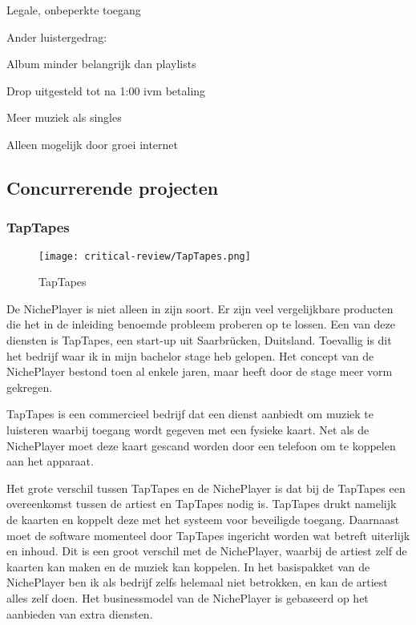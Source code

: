 \begin{todolist}
    \item Legale, onbeperkte toegang
    \item Ander luistergedrag: \begin{todolist}
        \item Album minder belangrijk dan playlists
        \item Drop uitgesteld tot na 1:00 ivm betaling
    \end{todolist}
    \item Meer muziek als singles
    \item Alleen mogelijk door groei internet
\end{todolist}

\subsection{Concurrerende projecten}
\subsubsection*{TapTapes}
\begin{wrapfigure}{r}{0.25\textwidth}
    \centering
    \texttt{[image: critical-review/TapTapes.png]}
    \caption{TapTapes}
    \label{fig:critical-review:TapTapes}
\end{wrapfigure}
De NichePlayer is niet alleen in zijn soort. Er zijn veel vergelijkbare producten die het in de inleiding benoemde probleem proberen op te lossen. Een van deze diensten is TapTapes, een start-up uit Saarbrücken, Duitsland. Toevallig is dit het bedrijf waar ik in mijn bachelor stage heb gelopen. Het concept van de NichePlayer bestond toen al enkele jaren, maar heeft door de stage meer vorm gekregen.

TapTapes is een commercieel bedrijf dat een dienst aanbiedt om muziek te luisteren waarbij toegang wordt gegeven met een fysieke kaart. Net als de NichePlayer moet deze kaart gescand worden door een telefoon om te koppelen aan het apparaat.

Het grote verschil tussen TapTapes en de NichePlayer is dat bij de TapTapes een overeenkomst tussen de artiest en TapTapes nodig is. TapTapes drukt namelijk de kaarten  en koppelt deze met het systeem voor beveiligde toegang. Daarnaast moet de software momenteel door TapTapes ingericht worden wat betreft uiterlijk en inhoud. Dit is een groot verschil met de NichePlayer, waarbij de artiest zelf de kaarten kan maken en de muziek kan koppelen. In het basispakket van de NichePlayer ben ik als bedrijf zelfs helemaal niet betrokken, en kan de artiest alles zelf doen. Het businessmodel van de NichePlayer is gebaseerd op het aanbieden van extra diensten.


